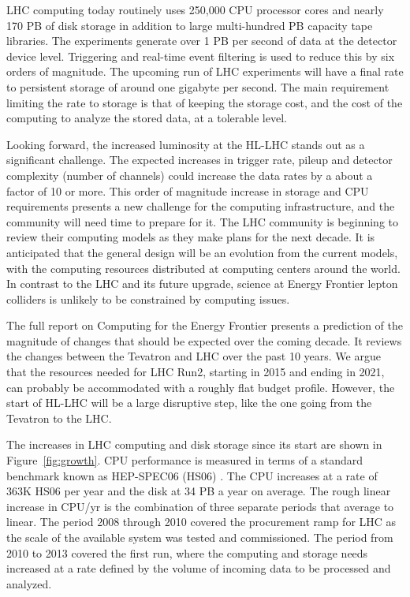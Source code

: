 LHC computing today routinely uses 250,000 CPU processor cores and nearly 170
PB of disk storage in addition to large multi-hundred PB capacity
tape libraries.  The experiments generate over 1 PB per second of data
at the detector device level. Triggering and real-time event filtering  is
used to reduce this by six orders of magnitude. 
The upcoming run of LHC experiments will have a final rate to persistent
storage of around one gigabyte per second. 
The main requirement limiting the rate to storage is that of keeping 
the storage cost, and the  cost of the computing to analyze
the stored data, at a tolerable level.

Looking forward, the increased luminosity at the
HL-LHC stands out as a significant challenge. 
The expected increases in trigger rate, pileup
and detector complexity (number of channels) could increase the data rates by
a about a factor of 10 or more.   This order of magnitude increase in storage
and CPU requirements presents a new challenge for the computing infrastructure,
and the community will need time to prepare for it. The LHC community is
beginning to review their computing models as they make plans for the next
decade.  It is anticipated that the general design will be an evolution from
the current models, with the computing resources distributed at computing
centers around the world.
In contrast to the LHC and its future upgrade, science at Energy Frontier 
lepton colliders is unlikely to be constrained by computing issues.  

The full report on Computing for the Energy Frontier \cite{Fisk:2014lia}
presents a  prediction 
of the magnitude of changes that should be expected over the coming decade. 
It reviews  the changes between the Tevatron and LHC over the past 10 years. 
We argue
that the resources needed for LHC Run2, starting in 2015 and ending
in 2021, can probably be
accommodated with a roughly flat budget profile. However, the start of HL-LHC
will be a large disruptive step, like the one going from the Tevatron to the
LHC.

The increases in LHC computing and disk storage since its start are shown in
Figure~\ref{fig:growth}.  CPU performance is measured in terms of a standard
benchmark known as HEP-SPEC06 (HS06) \cite{HS06}.
The CPU increases at a rate of 363K HS06 per year and
the disk at 34 PB a year on average.  The rough linear increase in CPU/yr
is the combination of three separate periods that average to linear.  The period
2008 through 2010 covered the procurement ramp for LHC as the scale of the
available system was tested and commissioned. The period from 2010 to 2013 covered
the first run, 
where the computing and storage needs increased at a rate defined by 
the volume of incoming data to be processed and analyzed.

